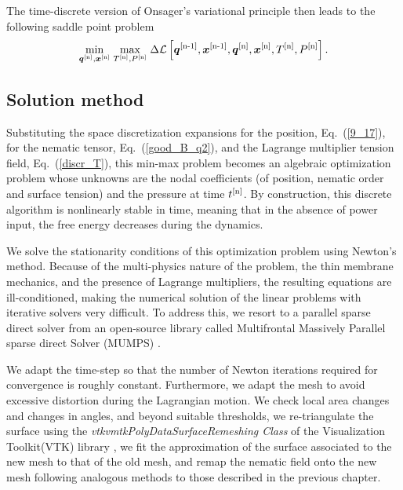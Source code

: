  
The time-discrete version of Onsager’s variational principle then leads to the following saddle point problem
\begin{align} \label{9_53}
\underset{ \bm{q}^{[\textup{n}]}, \bm{x}^{[\textup{n}]}}{\min}  \;\underset{ T^{[\textup{n}]},P^{[\textup{n}]} }{\max} \; \Delta \mathcal{L} \left[ \bm{q}^{[\textup{n-1}]}, \bm{x}^{[\textup{n-1}]},  \bm{q}^{[\textup{n}]}, \bm{x}^{[\textup{n}]}, T^{[\textup{n}]},P^{[\textup{n}]}   \right].
\end{align}



\subsection{Solution method}

Substituting the space discretization expansions for the position, Eq.~(\ref{9_17}), for the nematic tensor, Eq.~(\ref{good_B_q2}), and the Lagrange multiplier tension field, Eq.~(\ref{discr_T}), this min-max problem becomes an algebraic optimization problem whose unknowns are the nodal coefficients (of position, nematic order and surface tension) and the pressure at time $t^{[\textup{n}]}$. By construction, this discrete algorithm is nonlinearly stable in time, meaning that in the absence of power input, the free energy decreases during the dynamics. 

 We solve the stationarity conditions of this optimization problem using Newton's method. Because of the multi-physics nature of the problem, the thin membrane mechanics, and the presence of Lagrange multipliers, the resulting equations are ill-conditioned, making the numerical solution of the linear problems with iterative solvers very difficult. To address this, we resort to a parallel sparse direct solver from an open-source library called Multifrontal Massively Parallel sparse direct Solver (MUMPS) \cite{Amestoy2011}.

We adapt the time-step so that the number of Newton iterations required for convergence is roughly constant. Furthermore, we adapt the mesh to avoid excessive distortion during the Lagrangian motion. We check local area changes and changes in angles, and beyond suitable thresholds, we re-triangulate the surface using the \textit{vtkvmtkPolyDataSurfaceRemeshing Class} of the Visualization Toolkit(VTK) library \cite{schroeder2003}, we fit the approximation of the surface associated to the new mesh to that of the old mesh, and remap the nematic field onto the new mesh following analogous methods to those described in the previous chapter. 


